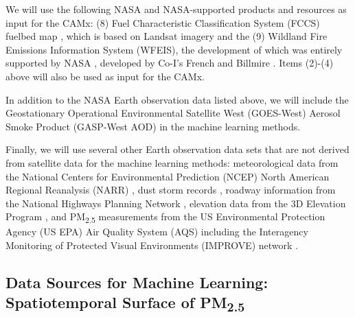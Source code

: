 \documentclass[authoryear]{elsarticle}
\begin{document}
We will use the following NASA and NASA-supported products and resources as input for the CAMx: 
(8) Fuel Characteristic Classification System (FCCS) fuelbed map \citep{McKenzie2012}, which is based on Landsat imagery and the 
(9) Wildland Fire Emissions Information System (WFEIS), the development of which was entirely supported by NASA  \citep{WFEIS2017}, developed by Co-I's French and Billmire \citep{French2014}. Items (2)-(4) above will also be used as input for the CAMx.

In addition to the NASA Earth observation data listed above, we will include the Geostationary Operational Environmental Satellite West (GOES-West) Aerosol Smoke Product (GASP-West AOD) \citep{GASPAerosolProduct2017} in the machine learning methods. 

Finally, we will use several other Earth observation data sets that are not derived from satellite data for the machine learning methods: 
meteorological data from the National Centers for Environmental Prediction (NCEP) North American Regional Reanalysis (NARR) \citep{Mesinger2006,NCEPReanalysis2005}, dust storm records \citep{NWSstorms2017}, roadway information from the National Highways Planning Network \citep{NHP2017}, elevation data from the 3D Elevation Program \citep{USGSElevation2017}, and PM\textsubscript{2.5} measurements from the US Environmental Protection Agency (US EPA) Air Quality System (AQS) \citep{EPAAirData2017} including the Interagency Monitoring of Protected Visual Environments (IMPROVE) network \citep{EPANPM25IMPROVE2017}.

\subsection{Data Sources for Machine Learning: Spatiotemporal Surface of \texorpdfstring{PM\textsubscript{2.5}}{}} \label{MLdataSources}

\end{document}
